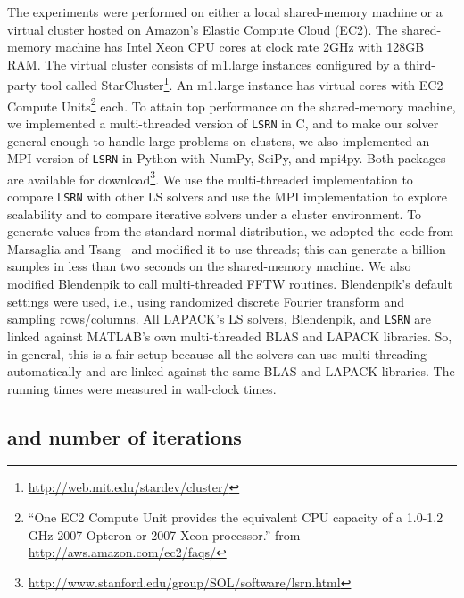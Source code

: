 \documentclass{siamltex}
\begin{document}
The experiments were performed on either a local shared-memory machine or a
virtual cluster hosted on Amazon's Elastic Compute Cloud (EC2). The
shared-memory machine has  Intel Xeon CPU cores at clock rate 2GHz with
128GB RAM. The virtual cluster consists of  m1.large instances configured by
a third-party tool called
StarCluster\footnote{\url{http://web.mit.edu/stardev/cluster/}}. An m1.large
instance has  virtual cores with  EC2 Compute Units\footnote{``One EC2
  Compute Unit provides the equivalent CPU capacity of a 1.0-1.2 GHz 2007
  Opteron or 2007 Xeon processor.'' from \url{http://aws.amazon.com/ec2/faqs/}}
each. To attain top performance on the shared-memory machine, we implemented a
multi-threaded version of \texttt{LSRN} in C, and to make our solver general
enough to handle large problems on clusters, we also implemented an MPI version
of \texttt{LSRN} in Python with NumPy, SciPy, and mpi4py. Both packages are
available for
download\footnote{\url{http://www.stanford.edu/group/SOL/software/lsrn.html}}. We
use the multi-threaded implementation to compare \texttt{LSRN} with other LS
solvers and use the MPI implementation to explore scalability and to compare
iterative solvers under a cluster environment. To generate values from the
standard normal distribution, we adopted the code from Marsaglia and
Tsang~\cite{marsaglia2000ziggurat} and modified it to use threads; this can
generate a billion samples in less than two seconds on the shared-memory
machine.  We also modified Blendenpik to call multi-threaded FFTW
routines. Blendenpik's default settings were used, i.e., using randomized
discrete Fourier transform and sampling  rows/columns. All LAPACK's
LS solvers, Blendenpik, and \texttt{LSRN} are linked against MATLAB's own
multi-threaded BLAS and LAPACK libraries. So, in general, this is a fair setup
because all the solvers can use multi-threading automatically and are linked
against the same BLAS and LAPACK libraries.  The running times were
measured in wall-clock times.

\subsection{ and number of iterations}
\label{sec:condition-number} 
\end{document}
